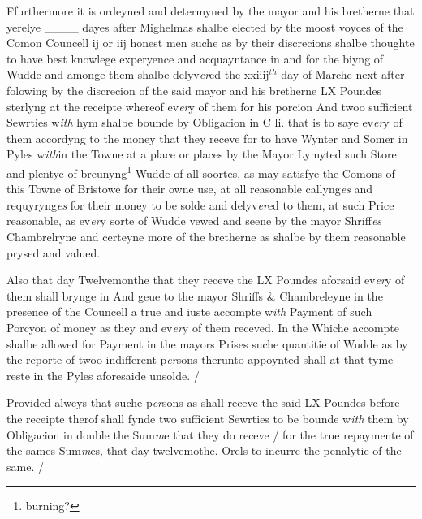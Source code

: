 \documentclass[a4paper,12pt]{article}
\begin{document}
Ffurthermore it is ordeyned and determyned by the mayor and his bretherne that yerelye \_\_\_\_ dayes after Mighelmas shalbe elected by the moost voyces of the Comon Councell ij or iij honest men suche as by their discrecions shalbe thoughte to have best knowlege experyence and acquayntance in and for the biyng of Wudde and amonge them shalbe delyv\textit{er}ed the xxiiij$^{th}$ day of Marche next after folowing by the discrecion of the said mayor and his bretherne LX Poundes sterlyng at the receipte whereof ev\textit{er}y of them for his porcion And twoo sufficient Sewrties w\textit{ith} hym shalbe bounde by Obligacion in C li. that is to saye ev\textit{er}y of them accordyng to the money that they receve for to have Wynter and Somer in Pyles w\textit{ith}in the Towne at a place or places by the Mayor Lymyted such Store and plentye of breunyng\footnote{burning?} Wudde of all soortes, as may satisfye the Comons of this Towne of Bristowe for their owne use, at all reasonable callyng\textit{es} and requyryng\textit{es} for their money to be solde and delyv\textit{er}ed to them, at such Price reasonable, as ev\textit{er}y sorte of Wudde vewed and seene by the mayor Shriff\textit{es} Chambrelryne and certeyne more of the bretherne as shalbe by them reasonable prysed and valued.

Also that day Twelvemonthe that they receve the LX Poundes aforsaid ev\textit{er}y of them shall brynge in And geue to the mayor Shriffs \& Chambreleyne in the presence of the Councell a true and iuste accompte w\textit{ith} Payment of such Porcyon of money as they and ev\textit{er}y of them receved. In the Whiche accompte shalbe allowed for Payment in the mayors Prises suche quantitie of Wudde as by the reporte of twoo indifferent p\textit{er}sons therunto appoynted shall at that tyme reste in the Pyles aforesaide unsolde. /

Provided alweys that suche p\textit{er}sons as shall receve the said LX Poundes before the receipte therof shall fynde two sufficient Sewrties to be bounde w\textit{ith} them by Obligacion in double the Sum\textit{m}e that they do receve / for the true repaymente of the sames Sum\textit{m}es, that day twelvemothe. Orels to incurre the penalytie of the same. / 
\end{document}
